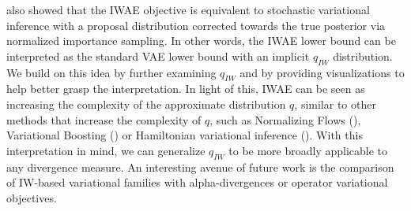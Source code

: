\documentclass{article} %
\begin{document}
\cite{bachman} also showed that the IWAE objective is equivalent to stochastic variational inference with a proposal distribution corrected towards the true posterior via normalized importance sampling. In other words, the IWAE lower bound can be interpreted as the standard VAE lower bound with an implicit $q_{IW}$ distribution. We build on this idea by further examining $q_{IW}$ and by providing visualizations to help better grasp the interpretation. In light of this, IWAE can be seen as increasing the complexity of the approximate distribution $q$, similar to other methods that increase the complexity of $q$, such as Normalizing Flows (\cite{normflow}), Variational Boosting (\cite{varboosting}) or Hamiltonian variational inference (\cite{salimans2015markov}). With this interpretation in mind, we can generalize $q_{IW}$ to be more broadly applicable to any divergence measure. An interesting avenue of future work is the comparison of IW-based variational families with alpha-divergences or operator variational objectives. 









 













\end{document}
